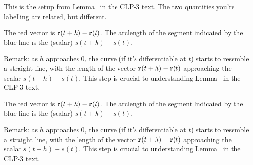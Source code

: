 \begin{hint}
This is the setup from Lemma~ in the CLP-3 text. 
The two quantities you're labelling are related, but different.
\end{hint}
\begin{answer}

\begin{center}
\end{center}
The red vector is $\mathbf{r}(t+h)-\mathbf{r}(t)$. The arclength of the segment indicated by the blue line is the (scalar) $s(t+h)-s(t)$.

Remark: as $h$ approaches 0, the curve (if it's differentiable at $t$) starts to resemble a straight line, with the length of the vector $\mathbf{r}(t+h)-\mathbf{r}(t)$ approaching the scalar $s(t+h)-s(t)$. This step is crucial to understanding Lemma~ in the CLP-3 text. 
\end{answer}
\begin{solution}

\begin{center}
\end{center}
The red vector is $\mathbf{r}(t+h)-\mathbf{r}(t)$. The arclength of the segment indicated by the blue line is the (scalar) $s(t+h)-s(t)$.

Remark: as $h$ approaches 0, the curve (if it's differentiable at $t$) starts to resemble a straight line, with the length of the vector $\mathbf{r}(t+h)-\mathbf{r}(t)$ approaching the scalar $s(t+h)-s(t)$. This step is crucial to understanding Lemma~ in the CLP-3 text. 

\end{solution}
